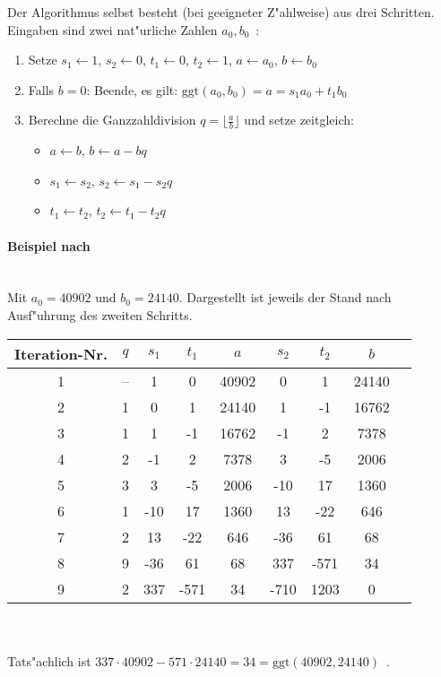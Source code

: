 \documentclass[12pt]{article}
\newcommand{\floor}[1]{\lfloor #1 \rfloor}
\begin{document}
Der Algorithmus selbst besteht (bei geeigneter Z"ahlweise) aus drei Schritten.
Eingaben sind zwei nat"urliche Zahlen $a_0, b_0$~\cite{taocp2}:
\begin{enumerate}
    \item Setze $s_1 \gets 1$, $s_2 \gets 0$, $t_1 \gets 0$, $t_2 \gets 1$, $a \gets a_0$, $b \gets b_0$
    \item Falls $b = 0$: Beende, es gilt: $\textrm{ggt}(a_0, b_0) = a = s_1 a_0 + t_1 b_0$
    \item Berechne die Ganzzahldivision $q = \floor{\frac{a}{b}}$ und setze zeitgleich:
    \begin{itemize}
        \item $a \gets b$, $b \gets a - bq$
        \item $s_1 \gets s_2$, $s_2 \gets s_1 - s_2 q$
        \item $t_1 \gets t_2$, $t_2 \gets t_1 - t_2 q$
    \end{itemize}
\end{enumerate}\cite{taocp2}

\paragraph{Beispiel nach~\cite{taocp2}}
~\\
Mit $a_0 = 40902$ und $b_0 = 24140$.
Dargestellt ist jeweils der Stand nach Ausf"uhrung des zweiten Schritts.\\

\begin{tabular}{c|c c c c c c c l}
    Iteration-Nr. & $q$ & $s_1$ & $t_1$ & $a$ & $s_2$ & $t_2$ & $b$ \\
    \hline
    1 & -- & 1 & 0 & 40902 & 0 & 1 & 24140 \\
    2 & 1 & 0 & 1 & 24140 & 1 & -1 & 16762 \\
    3 & 1 & 1 & -1 & 16762 & -1 & 2 & 7378 \\
    4 & 2 & -1 & 2 & 7378 & 3 & -5 & 2006 \\
    5 & 3 & 3 & -5 & 2006 & -10 & 17 & 1360 \\
    6 & 1 & -10 & 17 & 1360 & 13 & -22 & 646 \\
    7 & 2 & 13 & -22 & 646 & -36 & 61 & 68 \\
    8 & 9 & -36 & 61 & 68 & 337 & -571 & 34 \\
    9 & 2 & 337 & -571 & 34 & -710 & 1203 & 0 \\
\end{tabular}
~\\~\\
\noindent
Tats"achlich ist $337 \cdot 40902 - 571 \cdot 24140 = 34 = \textrm{ggt}(40902, 24140)$~\cite{taocp2}.
\end{document}
